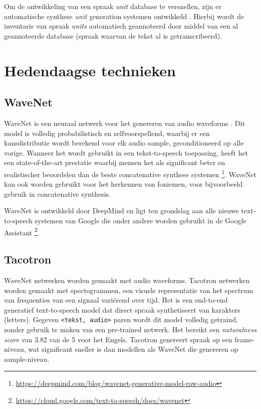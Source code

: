 Om de ontwikkeling van een spraak \textit{unit} database te versnellen, zijn er automatische synthese \textit{unit} generation systemen ontwikkeld \cite{nakajima1994automatic}. Hierbij wordt de inventaris van spraak \textit{units} automatisch geannoteerd door middel van een al geannoteerde database (spraak waarvan de tekst al is getranscribeerd).


\section{Hedendaagse technieken}

\subsection{WaveNet}
WaveNet is een neuraal netwerk voor het genereren van audio waveforms \cite{45774}. Dit model is volledig probabilistisch en zelfvoorspellend, waarbij er een kansdistributie wordt berekend voor elk audio sample, geconditioneerd op alle vorige. Wanneer het wordt gebruikt in een tekst-to-speech toepassing, heeft het een state-of-the-art prestatie waarbij mensen het als significant beter en realistischer beoordelen dan de beste concatenative synthese systemen \footnote{\url{https://deepmind.com/blog/wavenet-generative-model-raw-audio}}. WaveNet kan ook worden gebruikt voor het herkennen van foniemen, voor bijvoorbeeld gebruik in concatenative synthesis.

WaveNet is ontwikkeld door DeepMind en ligt ten grondslag aan alle nieuwe text-to-speech systemen van Google die onder andere worden gebruikt in de Google Assistant \footnote{\url{https://cloud.google.com/text-to-speech/docs/wavenet}}.


\subsection{Tacotron}
WaveNet netwerken worden gemaakt met audio waveforms. Tacotron\cite{Wang2017TacotronTE} netwerken worden gemaakt met spectogrammen, een visuele representatie van het spectrum van frequenties van een signaal variërend over tijd. Het is een end-to-end generatief text-to-speech model dat direct spraak synthetiseert van karakters (letters). Gegeven \texttt{<tekst, audio>} paren wordt dit model volledig getraind, zonder gebruik te maken van een pre-trained netwerk. Het bereikt een \textit{naturalness score} van 3.82 van de 5 voor het Engels. Tacotron genereert spraak op een frame-niveau, wat significant sneller is dan modellen als WaveNet die genereren op sample-niveau. 

